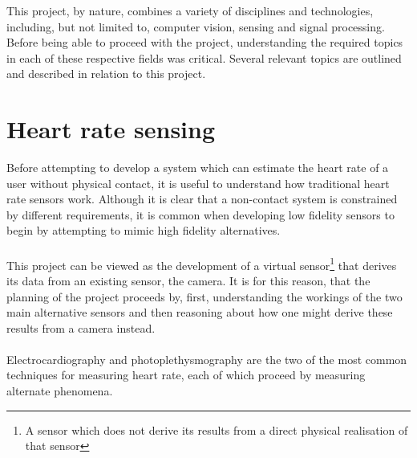 This project, by nature, combines a variety of disciplines and technologies, including, but not limited to, computer vision, sensing and signal processing. 
Before being able to proceed with the project, understanding the required topics in each of these respective fields was critical. Several relevant topics are outlined 
and described in relation to this project.

\section{Heart rate sensing}
\label{prep:hr_sensing}
Before attempting to develop a system which can estimate the heart rate of a user without physical contact, it is useful to understand how traditional heart rate sensors work.
Although it is clear that a non-contact system is constrained by different requirements, it is common when developing low fidelity sensors to begin by attempting to mimic high fidelity alternatives. \\\\
This project can be viewed as the development of a virtual sensor\footnote{A sensor which does not derive its results from a direct physical realisation of that sensor} that derives its data from an existing sensor, the camera. It is for this reason, that the planning of the project proceeds by, first, understanding the workings of the two main alternative sensors and then reasoning about how one might derive these results from a camera instead.
\\\\
Electrocardiography and photoplethysmography are the two of the most common techniques for measuring heart rate, each of which proceed by measuring alternate phenomena.

